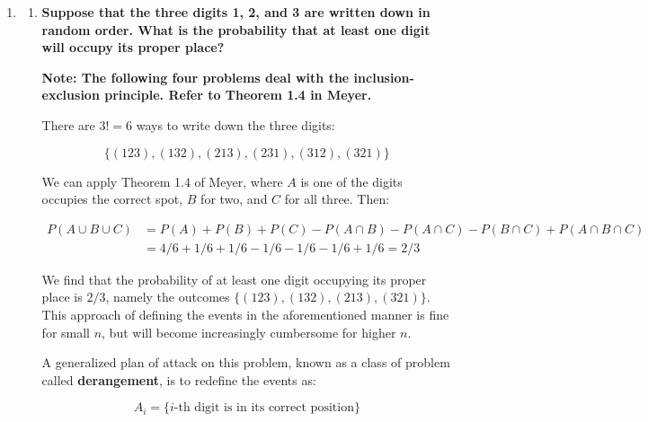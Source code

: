 \documentclass[10pt, oneside]{article}
\begin{document}
\begin{enumerate}[label=2.\arabic*]
\begin{enumerate}
	\textbf{Combination approach.} Now, there are four people with a badge number less than 5. Thus in fixing 5 as the largest badge number of the trio, there are $\binom 42 = \frac{4!}{2!2!}$ ways of choosing the remaining two people. Proceeding as in part (a), there is a $\binom{4}{2} / \binom {10}{3} = \boxed{1/20}$ probability that the largest badge number is 5.
	
	In both (a) and (b), the combination approach proved simpler. 
	\end{enumerate}
	
\item \begin{enumerate}
	\item \begin{tcolorbox}[
  colback=Cerulean!5!white,
  colframe=Cerulean!75!black]
	\textbf{Suppose that the three digits 1, 2, and 3 are written down in random order. What is the probability that at least one digit will occupy its proper place?}
	\end{tcolorbox}
	
	\textbf{Note: The following four problems deal with the inclusion-exclusion principle. Refer to Theorem 1.4 in Meyer.}
	
	There are $3! = 6$ ways to write down the three digits:
	
	\[ \{ (123), (132), (213), (231), (312), (321) \} \]
	
	We can apply Theorem 1.4 of Meyer, where $A$ is one of the digits occupies the correct spot, $B$ for two, and $C$ for all three. Then:
	
	\begin{align*}
	P(A \cup B \cup C) &= P(A) + P(B) + P(C) - P(A \cap B) - P(A \cap C) - P(B \cap C) + P(A \cap B \cap C) \\
	&= 4/6 + 1/6 + 1/6 - 1/6 - 1/6 - 1/6 + 1/6 = \boxed{2/3}
	\end{align*}
	
	We find that the probability of at least one digit occupying its proper place is $\boxed{2/3}$, namely the outcomes $\{ (123), (132), (213), (321)\}$. This approach of defining the events in the aforementioned manner is fine for small $n$, but will become increasingly cumbersome for higher $n$.
	
	A generalized plan of attack on this problem, known as a class of problem called \textbf{derangement}, is to redefine the events as:
	
	\[ A_i = \{ \text{$i$-th digit is in its correct position} \} \]
	

\end{enumerate}
\end{enumerate}
\end{document}
